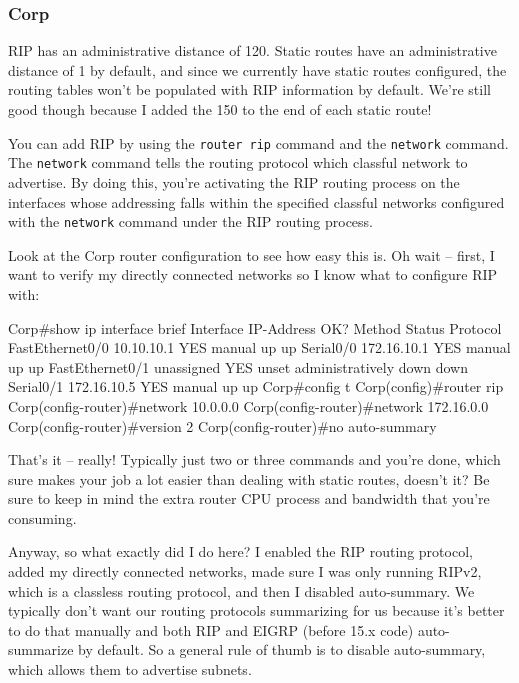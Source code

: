 \subsubsection{Corp}

RIP has an administrative distance of 120. Static routes have an
administrative distance of 1 by default, and since we currently have
static routes configured, the routing tables won't be populated with RIP
information by default. We're still good though because I added the 150
to the end of each static route!

You can add RIP by using the \texttt{router\ rip}
command and the \texttt{net}\texttt{work} command. The \texttt{network}
command tells the routing protocol which classful network to advertise.
By doing this, you're activating the RIP routing process on the
interfaces whose addressing falls within the specified classful networks
configured with the \texttt{network} command under the RIP routing process.

Look at the Corp router configuration to see how easy this is. Oh
wait -- first, I want to verify my directly connected networks so I know
what to configure RIP with:

\begin{cli}
Corp#show ip interface brief
Interface        IP-Address      OK? Method Status                Protocol
FastEthernet0/0  10.10.10.1      YES manual up                    up
Serial0/0        172.16.10.1     YES manual up                    up
FastEthernet0/1  unassigned      YES unset  administratively down down
Serial0/1        172.16.10.5     YES manual up                    up
Corp#config t
Corp(config)#router rip
Corp(config-router)#network 10.0.0.0
Corp(config-router)#network 172.16.0.0
Corp(config-router)#version 2
Corp(config-router)#no auto-summary
\end{cli}

That's it -- really!
Typically just two or three commands and you're done, which sure makes
your job a lot easier than dealing with static routes, doesn't it? Be
sure to keep in mind the extra router CPU process and bandwidth that
you're consuming.

Anyway, so what exactly did I do here? I enabled the RIP routing protocol, added my directly connected networks, made sure I was only
running RIPv2, which is a classless routing protocol, and then I disabled auto-summary.
We typically don't want our routing protocols summarizing for us because it's better to do that manually and both RIP and EIGRP (before 15.x code) auto-summarize by default.
So a general rule of thumb is to disable auto-summary, which allows them to advertise subnets.

